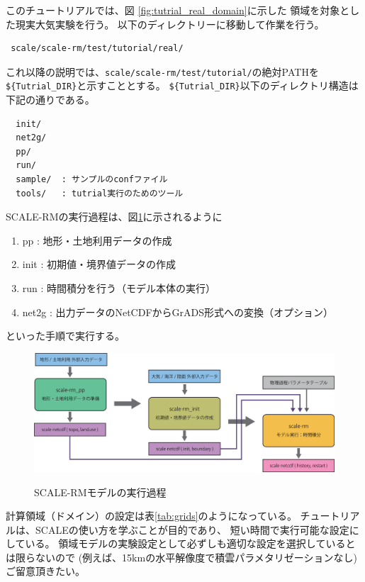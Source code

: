 
このチュートリアルでは、図 \ref{fig:tutrial_real_domain}に示した
領域を対象とした現実大気実験を行う。
以下のディレクトリーに移動して作業を行う。
\begin{verbatim}
 scale/scale-rm/test/tutorial/real/
\end{verbatim}
これ以降の説明では、\verb|scale/scale-rm/test/tutorial/|の絶対PATHを
\verb|${Tutrial_DIR}|と示すこととする。
\verb|${Tutrial_DIR}|以下のディレクトリ構造は下記の通りである。
\begin{verbatim}
  init/
  net2g/
  pp/
  run/
  sample/  : サンプルのconfファイル
  tools/   : tutrial実行のためのツール
\end{verbatim}

SCALE-RMの実行過程は、図\ref{fig:howto}に示されるように
\begin{enumerate}
\item pp    : 地形・土地利用データの作成
\item init  : 初期値・境界値データの作成
\item run   : 時間積分を行う（モデル本体の実行）
\item net2g : 出力データのNetCDFからGrADS形式への変換（オプション） 
\end{enumerate}
といった手順で実行する。


\begin{figure}[h]
\begin{center}
  \includegraphics[width=0.9\hsize]{./figure/real_procedure.eps}\\
  \caption{SCALE-RMモデルの実行過程}
  \label{fig:howto}
\end{center}
\end{figure}

計算領域（ドメイン）の設定は表\ref{tab:grids}のようになっている。
チュートリアルは、SCALEの使い方を学ぶことが目的であり、
短い時間で実行可能な設定にしている。
領域モデルの実験設定として必ずしも適切な設定を選択しているとは限らないので
(例えば、15kmの水平解像度で積雲パラメタリゼーションなし)
ご留意頂きたい。

